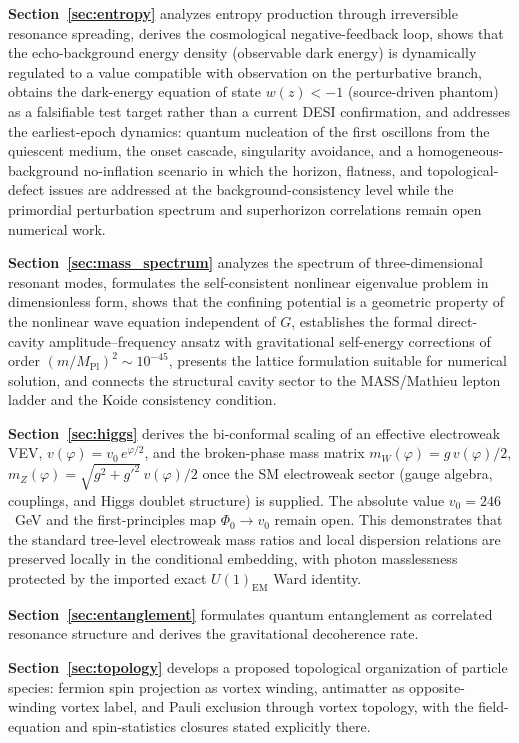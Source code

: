 \documentclass[aps,prd,onecolumn,superscriptaddress,nofootinbib,showpacs,12pt,notitlepage]{revtex4-2}
\newcommand{\Mpl}{M_{\mathrm{Pl}}}
\begin{document}
\textbf{Section~\ref{sec:entropy}} analyzes entropy production
through irreversible resonance spreading, derives the
cosmological negative-feedback loop, shows that the
echo-background energy density (observable dark energy)
is dynamically regulated to a value
compatible with observation on the perturbative branch, obtains the
dark-energy equation of state $w(z) < -1$ (source-driven phantom)
as a falsifiable test target rather than a current DESI confirmation,
and addresses the earliest-epoch
dynamics: quantum nucleation of the first oscillons from
the quiescent medium, the onset cascade, singularity
avoidance, and a homogeneous-background no-inflation
scenario in which the horizon, flatness, and
topological-defect issues are addressed at the
background-consistency level while the primordial
perturbation spectrum and superhorizon correlations
remain open numerical work.

\textbf{Section~\ref{sec:mass_spectrum}} analyzes the spectrum
of three-dimensional resonant modes, formulates the self-consistent
nonlinear eigenvalue problem in dimensionless form, shows that
the confining potential is a geometric property of the nonlinear
wave equation independent of $G$, establishes the formal
direct-cavity amplitude--frequency ansatz with gravitational
self-energy corrections of order $(m/\Mpl)^2 \sim 10^{-45}$,
presents the lattice formulation suitable for numerical solution,
and connects the structural cavity sector to the MASS/Mathieu
lepton ladder and the Koide consistency condition.

\textbf{Section~\ref{sec:higgs}} derives the bi-conformal
scaling of an effective electroweak VEV,
$v(\varphi) = v_0\,e^{\varphi/2}$, and the broken-phase mass
matrix $m_W(\varphi)=g\,v(\varphi)/2$,
$m_Z(\varphi)=\sqrt{g^2+g'^2}\,v(\varphi)/2$ once the
SM electroweak sector (gauge algebra, couplings, and Higgs
doublet structure) is supplied.  The absolute value
$v_0 = 246$~GeV and the first-principles map
$\Phi_0 \to v_0$ remain open.  This demonstrates that
the standard tree-level electroweak mass ratios and local
dispersion relations are preserved locally in the conditional
embedding, with photon masslessness protected by the imported
exact $U(1)_{\mathrm{EM}}$ Ward identity.

\textbf{Section~\ref{sec:entanglement}} formulates quantum
entanglement as correlated resonance structure and derives the
gravitational decoherence rate.

\textbf{Section~\ref{sec:topology}} develops a proposed
topological organization of particle species: fermion spin
projection as vortex winding, antimatter as opposite-winding
vortex label, and Pauli exclusion through vortex topology,
with the field-equation and spin-statistics closures stated
explicitly there.
\end{document}
